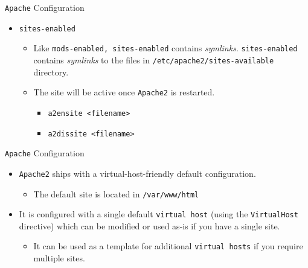 \documentclass[xcolor=table]{beamer}
\begin{document}
\begin{frame}{\texttt{Apache} Configuration}
  \begin{itemize}
    \item \texttt{sites-enabled} 
      \begin{itemize}
        \item Like \texttt{mods-enabled, sites-enabled} contains \textit{symlinks}.  \texttt{sites-enabled} contains \textit{symlinks} to the files in \texttt{/etc/apache2/sites-available} directory. 
        \item The site will be active once \texttt{Apache2} is restarted.
          \begin{itemize}
            \item \texttt{a2ensite \textless filename\textgreater}
            \item \texttt{a2dissite \textless filename\textgreater}
          \end{itemize}
      \end{itemize}
  \end{itemize}
\end{frame}

\begin{frame}{\texttt{Apache} Configuration}
  \begin{itemize}
    \item \texttt{Apache2} ships with a virtual-host-friendly default configuration. 
      \begin{itemize}
        \item The default site is located in \texttt{/var/www/html}
      \end{itemize}
    \item It is configured with a single default \texttt{virtual host} (using the \texttt{VirtualHost} directive) which can be modified or used as-is if you have a single site.
      \begin{itemize}
        \item It can be used as a template for additional \texttt{virtual hosts} if you require multiple sites. 
      \end{itemize}
  \end{itemize}
\end{frame}
\end{document}
